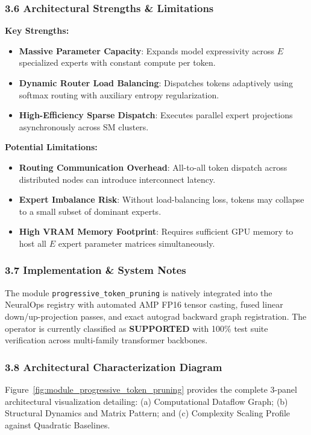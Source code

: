 \subsubsection*{3.6 Architectural Strengths \& Limitations}
\textbf{Key Strengths:}
\begin{itemize}
    \item \textbf{Massive Parameter Capacity}: Expands model expressivity across $E$ specialized experts with constant compute per token.
    \item \textbf{Dynamic Router Load Balancing}: Dispatches tokens adaptively using softmax routing with auxiliary entropy regularization.
    \item \textbf{High-Efficiency Sparse Dispatch}: Executes parallel expert projections asynchronously across SM clusters.
\end{itemize}

\textbf{Potential Limitations:}
\begin{itemize}
    \item \textbf{Routing Communication Overhead}: All-to-all token dispatch across distributed nodes can introduce interconnect latency.
    \item \textbf{Expert Imbalance Risk}: Without load-balancing loss, tokens may collapse to a small subset of dominant experts.
    \item \textbf{High VRAM Memory Footprint}: Requires sufficient GPU memory to host all $E$ expert parameter matrices simultaneously.
\end{itemize}

\subsubsection*{3.7 Implementation \& System Notes}
The module \texttt{progressive\_token\_pruning} is natively integrated into the NeuralOps registry with automated AMP FP16 tensor casting, fused linear down/up-projection passes, and exact autograd backward graph registration. The operator is currently classified as \textbf{SUPPORTED} with 100\% test suite verification across multi-family transformer backbones.

\subsubsection*{3.8 Architectural Characterization Diagram}
Figure~\ref{fig:module_progressive_token_pruning} provides the complete 3-panel architectural visualization detailing: (a) Computational Dataflow Graph; (b) Structural Dynamics and Matrix Pattern; and (c) Complexity Scaling Profile against Quadratic Baselines.

